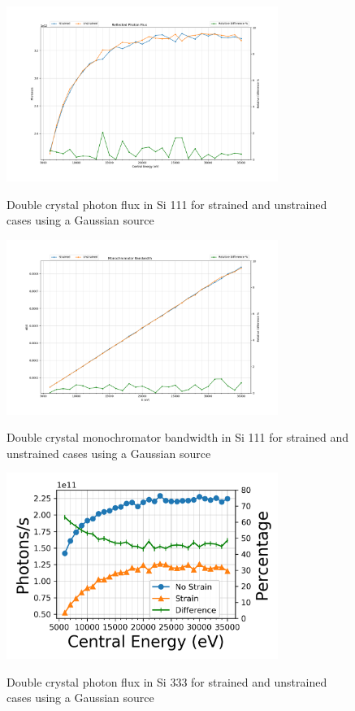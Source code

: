 \documentclass[preprint]{iucr}              %
\begin{document}
\begin{figure}
\caption{Double crystal photon flux in Si 111 for strained and unstrained cases using a Gaussian source}
\includegraphics[width = 8.85cm]{images/111flux.png}
\label{fig:111flux}
\end{figure}

\begin{figure}
\caption{Double crystal monochromator bandwidth in Si 111 for strained and unstrained cases using a Gaussian source}
\includegraphics[width = 8.85cm]{images/111monobw.png}
\label{fig:111monobw}
\end{figure}

\begin{figure}
\caption{Double crystal photon flux in Si 333 for strained and unstrained cases using a Gaussian source}
\includegraphics[width = 8.85cm]{images/333flux.png}
\label{fig:333flux}
\end{figure}
\end{document}
